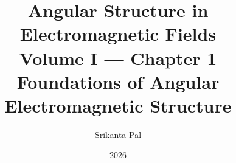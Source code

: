 

\title{Angular Structure in Electromagnetic Fields\\[0.4em]
  \large Volume I --- Chapter 1\\[0.3em]
  \normalsize Foundations of Angular Electromagnetic Structure}
\author{Srikanta Pal}
\date{2026}


\makeatletter
\begingroup
\setcounter{chapter}{1}
\label{ch:02}
\label{ch:03}
\label{ch:04}
\setcounter{chapter}{0}
\endgroup
\makeatother
\maketitle
\tableofcontents
\clearpage






